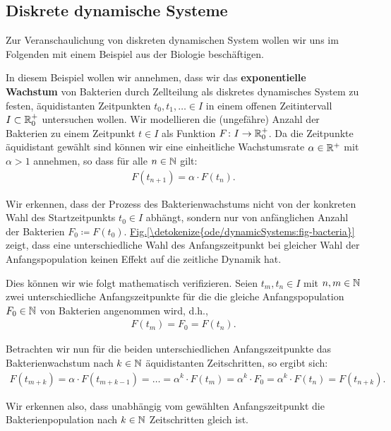 \subsection{Diskrete dynamische Systeme}
\label{\detokenize{ode/dynamicSystems:diskrete-dynamische-systeme}}
\par
Zur Veranschaulichung von diskreten dynamischen System wollen wir uns im Folgenden mit einem Beispiel aus der Biologie beschäftigen.
\label{ode/dynamicSystems:ex:bacteria}
\begin{example}{}{}



\par
In diesem Beispiel wollen wir annehmen, dass wir das \textbf{exponentielle Wachstum} von Bakterien durch Zellteilung als diskretes dynamisches System zu festen, äquidistanten Zeitpunkten \(t_0, t_1, \ldots \in I\) in einem offenen Zeitintervall \(I\subset\mathbb{R}^+_0\) untersuchen wollen.
Wir modellieren die (ungefähre) Anzahl der Bakterien zu einem Zeitpunkt \(t \in I\) als Funktion \(F \colon I \rightarrow \mathbb{R}_0^+\).
Da die Zeitpunkte äquidistant gewählt sind können wir eine einheitliche Wachstumsrate \(\alpha \in \mathbb{R}^+\) mit \(\alpha > 1\) annehmen, so dass für alle \(n \in \mathbb{N}\) gilt:
\begin{align*}
F(t_{n+1}) = \alpha \cdot F(t_n).
\end{align*}
\par
Wir erkennen, dass der Prozess des Bakterienwachstums nicht von der konkreten Wahl des Startzeitpunkts \(t_0 \in I\) abhängt, sondern nur von anfänglichen Anzahl der Bakterien \(F_0 \coloneqq F(t_0)\). \hyperref[\detokenize{ode/dynamicSystems:fig-bacteria}]{Fig.\@ \ref{\detokenize{ode/dynamicSystems:fig-bacteria}}} zeigt, dass eine unterschiedliche Wahl des Anfangszeitpunkt bei gleicher Wahl der Anfangspopulation keinen Effekt auf die zeitliche Dynamik hat.

\par
Dies können wir wie folgt mathematisch verifizieren. Seien \(t_m, t_n \in I\) mit \(n,m \in \mathbb{N}\) zwei unterschiedliche Anfangszeitpunkte für die die gleiche Anfangspopulation \(F_0 \in \mathbb{N}\) von Bakterien angenommen wird, d.h.,
\begin{align*}
F(t_m) = F_0 = F(t_n).
\end{align*}
\par
Betrachten wir nun für die beiden unterschiedlichen Anfangszeitpunkte das Bakterienwachstum nach \(k \in \mathbb{N}\) äquidistanten Zeitschritten, so ergibt sich:
\begin{align*}
F(t_{m+k}) = \alpha \cdot F(t_{m+k-1}) = \ldots = \alpha^k \cdot F(t_{m}) = \alpha^k \cdot F_0 = \alpha^k \cdot F(t_n) = F(t_{n+k}).
\end{align*}
\par
Wir erkennen also, dass unabhängig vom gewählten Anfangszeitpunkt die Bakterienpopulation nach \(k \in \mathbb{N}\) Zeitschritten gleich ist.
\end{example}

